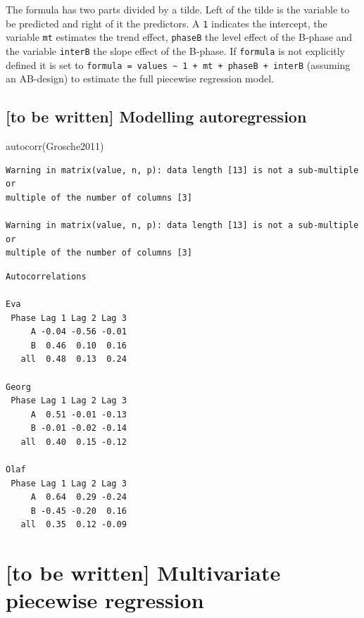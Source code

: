 \documentclass[
]{book}
\newenvironment{Shaded}{\begin{snugshade}}{\end{snugshade}}
\newcommand{\FunctionTok}[1]{\textcolor[rgb]{0.00,0.00,0.00}{#1}}
\newcommand{\NormalTok}[1]{#1}
\begin{document}
The formula has two parts divided by a tilde. Left of the tilde is the variable to be predicted and right of it the predictors. A \texttt{1} indicates the intercept, the variable \texttt{mt} estimates the trend effect, \texttt{phaseB} the level effect of the B-phase and the variable \texttt{interB} the slope effect of the B-phase. If \texttt{formula} is not explicitly defined it is set to \texttt{formula\ =\ values\ \textasciitilde{}\ 1\ +\ mt\ +\ phaseB\ +\ interB} (assuming an AB-design) to estimate the full piecewise regression model.

\hypertarget{to-be-written-modelling-autoregression}{%
\subsection{{[}to be written{]} Modelling autoregression}\label{to-be-written-modelling-autoregression}}

\begin{Shaded}
\begin{Highlighting}[]
\FunctionTok{autocorr}\NormalTok{(Grosche2011)}
\end{Highlighting}
\end{Shaded}

\begin{verbatim}
Warning in matrix(value, n, p): data length [13] is not a sub-multiple or
multiple of the number of columns [3]

Warning in matrix(value, n, p): data length [13] is not a sub-multiple or
multiple of the number of columns [3]
\end{verbatim}

\begin{verbatim}
Autocorrelations

Eva 
 Phase Lag 1 Lag 2 Lag 3
     A -0.04 -0.56 -0.01
     B  0.46  0.10  0.16
   all  0.48  0.13  0.24

Georg 
 Phase Lag 1 Lag 2 Lag 3
     A  0.51 -0.01 -0.13
     B -0.01 -0.02 -0.14
   all  0.40  0.15 -0.12

Olaf 
 Phase Lag 1 Lag 2 Lag 3
     A  0.64  0.29 -0.24
     B -0.45 -0.20  0.16
   all  0.35  0.12 -0.09
\end{verbatim}

\hypertarget{to-be-written-multivariate-piecewise-regression}{%
\section{{[}to be written{]} Multivariate piecewise regression}\label{to-be-written-multivariate-piecewise-regression}}
\end{document}
